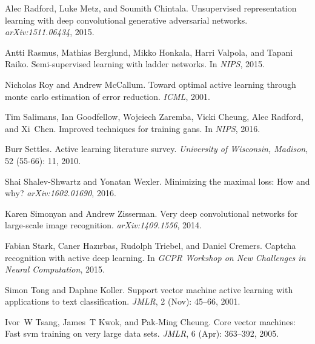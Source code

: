 \documentclass{article} %
\begin{document}
\begin{thebibliography}{40}
Alec Radford, Luke Metz, and Soumith Chintala.
\newblock Unsupervised representation learning with deep convolutional
  generative adversarial networks.
\newblock \emph{arXiv:1511.06434}, 2015.

Antti Rasmus, Mathias Berglund, Mikko Honkala, Harri Valpola, and Tapani Raiko.
\newblock Semi-supervised learning with ladder networks.
\newblock In \emph{NIPS}, 2015.

Nicholas Roy and Andrew McCallum.
\newblock Toward optimal active learning through monte carlo estimation of
  error reduction.
\newblock \emph{ICML}, 2001.

Tim Salimans, Ian Goodfellow, Wojciech Zaremba, Vicki Cheung, Alec Radford, and
  Xi~Chen.
\newblock Improved techniques for training gans.
\newblock In \emph{NIPS}, 2016.

Burr Settles.
\newblock Active learning literature survey.
\newblock \emph{University of Wisconsin, Madison}, 52
  (55-66): 11, 2010.

Shai Shalev-Shwartz and Yonatan Wexler.
\newblock Minimizing the maximal loss: How and why?
\newblock \emph{arXiv:1602.01690}, 2016.

Karen Simonyan and Andrew Zisserman.
\newblock Very deep convolutional networks for large-scale image recognition.
\newblock \emph{arXiv:1409.1556}, 2014.

Fabian Stark, Caner Haz{\i}rbas, Rudolph Triebel, and Daniel Cremers.
\newblock Captcha recognition with active deep learning.
\newblock In \emph{GCPR Workshop on New Challenges in Neural Computation},
  2015.

Simon Tong and Daphne Koller.
\newblock Support vector machine active learning with applications to text
  classification.
\newblock \emph{JMLR}, 2 (Nov): 45--66, 2001.

Ivor~W Tsang, James~T Kwok, and Pak-Ming Cheung.
\newblock Core vector machines: Fast svm training on very large data sets.
\newblock \emph{JMLR}, 6 (Apr): 363--392, 2005.


\end{thebibliography}
\end{document}
